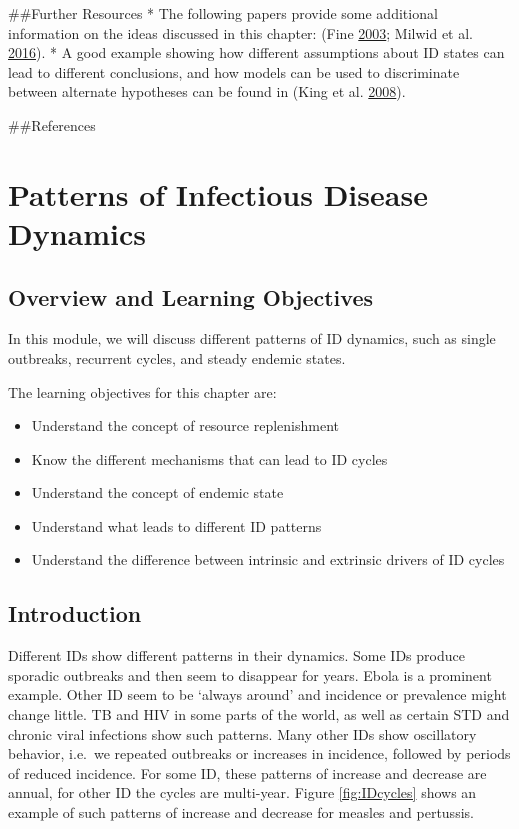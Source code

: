 \documentclass[]{book}
\providecommand{\tightlist}{%
  \setlength{\itemsep}{0pt}\setlength{\parskip}{0pt}}
\theoremstyle{definition}
\theoremstyle{definition}
\theoremstyle{definition}
\theoremstyle{remark}
\begin{document}
\#\#Further Resources * The following papers provide some additional
information on the ideas discussed in this chapter: (Fine
\protect\hyperlink{ref-fine03}{2003}; Milwid et al.
\protect\hyperlink{ref-milwid16}{2016}). * A good example showing how
different assumptions about ID states can lead to different conclusions,
and how models can be used to discriminate between alternate hypotheses
can be found in (King et al. \protect\hyperlink{ref-king08}{2008}).

\#\#References

\hypertarget{patterns-of-infectious-disease-dynamics}{%
\chapter{Patterns of Infectious Disease
Dynamics}\label{patterns-of-infectious-disease-dynamics}}

\hypertarget{overview-and-learning-objectives-2}{%
\section{Overview and Learning
Objectives}\label{overview-and-learning-objectives-2}}

In this module, we will discuss different patterns of ID dynamics, such
as single outbreaks, recurrent cycles, and steady endemic states.

The learning objectives for this chapter are:

\begin{itemize}
\tightlist
\item
  Understand the concept of resource replenishment
\item
  Know the different mechanisms that can lead to ID cycles
\item
  Understand the concept of endemic state
\item
  Understand what leads to different ID patterns
\item
  Understand the difference between intrinsic and extrinsic drivers of
  ID cycles
\end{itemize}

\hypertarget{introduction-1}{%
\section{Introduction}\label{introduction-1}}

Different IDs show different patterns in their dynamics. Some IDs
produce sporadic outbreaks and then seem to disappear for years. Ebola
is a prominent example. Other ID seem to be `always around' and
incidence or prevalence might change little. TB and HIV in some parts of
the world, as well as certain STD and chronic viral infections show such
patterns. Many other IDs show oscillatory behavior, i.e.~we repeated
outbreaks or increases in incidence, followed by periods of reduced
incidence. For some ID, these patterns of increase and decrease are
annual, for other ID the cycles are multi-year. Figure
\ref{fig:IDcycles} shows an example of such patterns of increase and
decrease for measles and pertussis.
\end{document}

